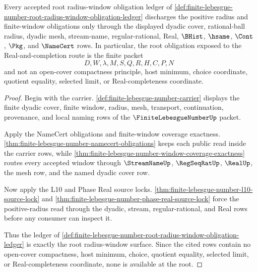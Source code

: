 \begin{theorem}
\label{thm:finite-lebesgue-number-root-radius-window-obligation-surface}
Every accepted root radius-window obligation ledger of \autoref{def:finite-lebesgue-number-root-radius-window-obligation-ledger} discharges the positive radius and finite-window obligations only through the displayed dyadic cover, rational-ball radius, dyadic mesh, stream-name, regular-rational, Real, $\BHist$, $\hsame$, $\Cont$, $\Pkg$, and $\NameCert$ rows. In particular, the root obligation exposed to the Real-and-completion route is the finite packet
$$
D,W,\lambda,M,S,Q,R,H,C,P,N
$$
and not an open-cover compactness principle, host minimum, choice coordinate, quotient equality, selected limit, or Real-completeness coordinate.
\end{theorem}
\begin{proof}
Begin with the carrier. \autoref{def:finite-lebesgue-number-carrier} displays the finite dyadic cover, finite window, radius, mesh, transport, continuation, provenance, and local naming rows of the $\FiniteLebesgueNumberUp$ packet.

Apply the NameCert obligations and finite-window coverage exactness. \autoref{thm:finite-lebesgue-number-namecert-obligations} keeps each public read inside the carrier rows, while \autoref{thm:finite-lebesgue-number-window-coverage-exactness} routes every accepted window through $\StreamNameUp$, $\RegSeqRatUp$, $\RealUp$, the mesh row, and the named dyadic cover row.

Now apply the L10 and Phase Real source locks. \autoref{thm:finite-lebesgue-number-l10-source-lock} and \autoref{thm:finite-lebesgue-number-phase-real-source-lock} force the positive-radius read through the dyadic, stream, regular-rational, and Real rows before any consumer can inspect it.

Thus the ledger of \autoref{def:finite-lebesgue-number-root-radius-window-obligation-ledger} is exactly the root radius-window surface. Since the cited rows contain no open-cover compactness, host minimum, choice, quotient equality, selected limit, or Real-completeness coordinate, none is available at the root.
\end{proof}

